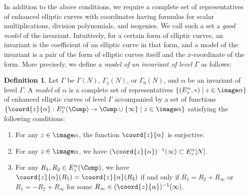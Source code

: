 \documentclass{amsart}
\theoremstyle{definition}
\newtheorem{definition}[theorem]{Definition}
\theoremstyle{remark}
\numberwithin{equation}{section}
\begin{document}
In addition to the above conditions,
we require a complete set of representatives of enhanced elliptic curves
with coordinates having formulas for scalar multiplications, division polynomials, and isogenies.
We call such a set a \emph{good model} of the invariant.
Intuitively,
for a certain form of elliptic curves,
an invariant is the coefficient of an elliptic curve in that form,
and a model of the invariant is a pair of the form of elliptic curves itself
and the $x$-coordinate of the form.
More precisely, we define a \emph{model of an invariant of level $\Gamma$} as follows:
\begin{definition}
    Let $\Gamma$ be $\Gamma(N)$, $\Gamma_1(N)$, or $\Gamma_0(N)$,
    and $\alpha$ be an invariant of level $\Gamma$.
    A \emph{model} of $\alpha$ is
    a complete set of representatives
    $\{(E_z^\alpha, \ast) \mid z \in \image \alpha\}$
    of enhanced elliptic curves of level $\Gamma$
    accompanied by
    a set of functions
    $\{\coord{z}{\alpha} : E_z^\alpha(\Comp) \to \Comp \cup \{\infty\} \mid z \in \image\alpha\}$
    satisfying the following conditions:
    \begin{enumerate}
        \item For any $z \in \image \alpha$,
            the function $\coord{z}{\alpha}$ is surjective. \label{item:model_surjective}
        \item For any $z \in \image \alpha$, we have
            $(\coord{z}{\alpha})^{-1}(\infty) \subset E_z^\alpha[N]$. \label{item:model_infinity}
        \item For any $R_1, R_2 \in E_z^\alpha(\Comp)$,
            we have $\coord{z}{\alpha}(R_1) = \coord{z}{\alpha}(R_2)$
            if and only if $R_1 = R_2 + R_\infty$ or $R_1 = -R_2 + R_\infty$
            for some $R_\infty \in (\coord{z}{\alpha})^{-1}(\infty)$. \label{item:model_equivalence}
    \end{enumerate}


\end{definition}
\end{document}
